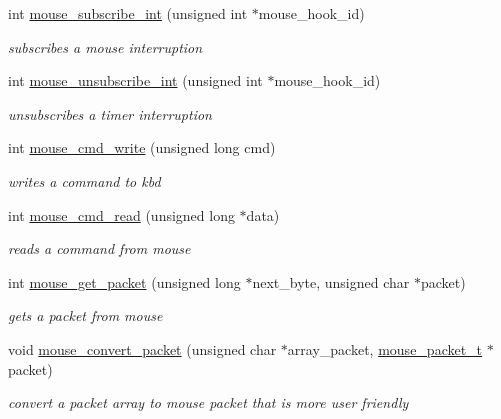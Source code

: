\begin{DoxyCompactItemize}
\item 
int \hyperlink{group__mouse_gad607aaa8fd9833789fcd2b99c86dfc34}{mouse\+\_\+subscribe\+\_\+int} (unsigned int $\ast$mouse\+\_\+hook\+\_\+id)
\begin{DoxyCompactList}\small\item\em subscribes a mouse interruption \end{DoxyCompactList}\item 
int \hyperlink{group__mouse_gaa40354aab63adaf9ecddd01255efd918}{mouse\+\_\+unsubscribe\+\_\+int} (unsigned int $\ast$mouse\+\_\+hook\+\_\+id)
\begin{DoxyCompactList}\small\item\em unsubscribes a timer interruption \end{DoxyCompactList}\item 
int \hyperlink{group__mouse_ga42d943d35caacd5219cf4ef665b9bc42}{mouse\+\_\+cmd\+\_\+write} (unsigned long cmd)
\begin{DoxyCompactList}\small\item\em writes a command to kbd \end{DoxyCompactList}\item 
int \hyperlink{group__mouse_ga3a8a668ee784e6662fb1c2fd31e811b0}{mouse\+\_\+cmd\+\_\+read} (unsigned long $\ast$data)
\begin{DoxyCompactList}\small\item\em reads a command from mouse \end{DoxyCompactList}\item 
int \hyperlink{group__mouse_ga936c78f40a1d0b1acfd4f0368a9b8137}{mouse\+\_\+get\+\_\+packet} (unsigned long $\ast$next\+\_\+byte, unsigned char $\ast$packet)
\begin{DoxyCompactList}\small\item\em gets a packet from mouse \end{DoxyCompactList}\item 
void \hyperlink{group__mouse_gaf1a4587fac965330aca5079ae1313327}{mouse\+\_\+convert\+\_\+packet} (unsigned char $\ast$array\+\_\+packet, \hyperlink{structmouse__packet__t}{mouse\+\_\+packet\+\_\+t} $\ast$packet)
\begin{DoxyCompactList}\small\item\em convert a packet array to mouse packet that is more user friendly \end{DoxyCompactList}\end{DoxyCompactItemize}



